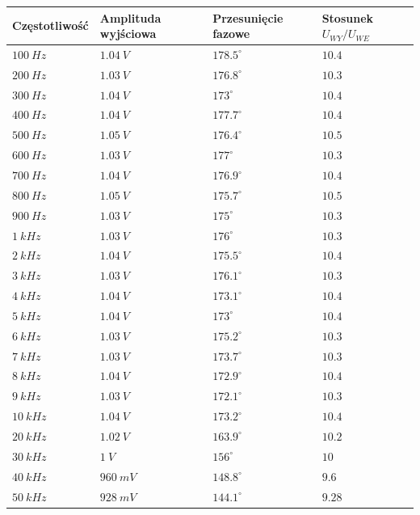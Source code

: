 \documentclass[14pt, table]{extarticle}
\begin{document}
\begin{tabular}{ | m{4cm} | m{4cm}| m{4cm} | m{3.5cm} | } 
  \hline
  \textbf{Częstotliwość} & \textbf{Amplituda wyjściowa} & \textbf{Przesunięcie fazowe} & \textbf{Stosunek } $U_{WY} / U_{WE}$ \\ 
  \hline
  $100 \ Hz$ & $1.04 \ V$ & $178.5^{\circ}$ & $10.4$ \\
  \hline
  $200 \ Hz$ & $1.03 \ V$ & $176.8^{\circ}$ & $10.3$ \\
  \hline
  $300 \ Hz$ & $1.04 \ V$ & $173^{\circ}$ & $10.4$ \\
  \hline
  $400 \ Hz$ & $1.04 \ V$ & $177.7^{\circ}$ & $10.4$ \\  
  \hline
  $500 \ Hz$ & $1.05 \ V$ & $176.4^{\circ}$ & $10.5$ \\
  \hline
  $600 \ Hz$ & $1.03 \ V$ & $177^{\circ}$ & $10.3$ \\
  \hline
  $700 \ Hz$ & $1.04 \ V$ & $176.9^{\circ}$ & $10.4$ \\
  \hline
  $800 \ Hz$ & $1.05 \ V$ & $175.7^{\circ}$ & $10.5$ \\
  \hline
  $900 \ Hz$ & $1.03 \ V$ & $175^{\circ}$ & $10.3$ \\
  \hline
  $1 \ kHz$ & $1.03 \ V$ & $176^{\circ}$ & $10.3$ \\
  \hline
  $2 \ kHz$ & $1.04 \ V$ & $175.5^{\circ}$ & $10.4$ \\
  \hline
  $3 \ kHz$ & $1.03 \ V$ & $176.1^{\circ}$ & $10.3$ \\
  \hline
  $4 \ kHz$ & $1.04 \ V$ & $173.1^{\circ}$ & $10.4$ \\
  \hline
  $5 \ kHz$ & $1.04 \ V$ & $173^{\circ}$ & $10.4$ \\
  \hline
  $6 \ kHz$ & $1.03 \ V$ & $175.2^{\circ}$ & $10.3$ \\
  \hline
  $7 \ kHz$ & $1.03 \ V$ & $173.7^{\circ}$ & $10.3$ \\
  \hline
  $8 \ kHz$ & $1.04 \ V$ & $172.9^{\circ}$ & $10.4$ \\
  \hline
  $9 \ kHz$ & $1.03 \ V$ & $172.1^{\circ}$ & $10.3$ \\
  \hline
  $10 \ kHz$ & $1.04 \ V$ & $173.2^{\circ}$ & $10.4$ \\
  \hline
  $20 \ kHz$ & $1.02 \ V$ & $163.9^{\circ}$ & $10.2$ \\
  \hline
  $30 \ kHz$ & $1 \ V$ & $156^{\circ}$ & $10$ \\
  \hline
  $40 \ kHz$ & $960 \ mV$ & $148.8^{\circ}$ & $9.6$ \\
  \hline
  $50 \ kHz$ & $928 \ mV$ & $144.1^{\circ}$ & $9.28$ \\

\end{tabular}
\end{document}
